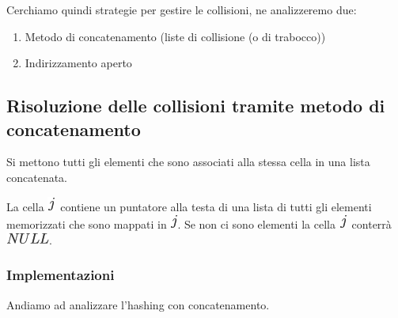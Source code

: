 \documentclass{article}
\providecommand{\tightlist}{%
  \setlength{\itemsep}{0pt}\setlength{\parskip}{0pt}}
\begin{document}
{Cerchiamo quindi strategie per gestire le collisioni, ne analizzeremo
due:}

\begin{enumerate}
\tightlist
\item
  {Metodo di concatenamento (liste di collisione (o di trabocco))}
\item
  {Indirizzamento aperto}
\end{enumerate}

{}

{}

\hypertarget{h.ocrobrrshwsz}{\subsection{\texorpdfstring{{Risoluzione
delle collisioni tramite metodo di
concatenamento}}{Risoluzione delle collisioni tramite metodo di concatenamento}}\label{h.ocrobrrshwsz}}

{Si mettono tutti gli elementi che sono associati alla stessa cella in
una lista concatenata.}

{}

{La cella }\includegraphics{images/image239.png}{~contiene un puntatore
alla testa di una lista di tutti gli elementi memorizzati che sono
mappati in }\includegraphics{images/image239.png}{. Se non ci sono
elementi la cella }\includegraphics{images/image239.png}{~conterrà
}\includegraphics{images/image240.png}{.}

{}

\hypertarget{h.lhp1y3nzdu6x}{\subsubsection{\texorpdfstring{{Implementazioni}}{Implementazioni}}\label{h.lhp1y3nzdu6x}}

{}

{Andiamo ad analizzare l'hashing con concatenamento.}

{}

\protect\hypertarget{t.4c8d61e7e14e07dc1d88e32b3d14a2e8168251a4}{}{}\protect\hypertarget{t.32}{}{}
\end{document}
